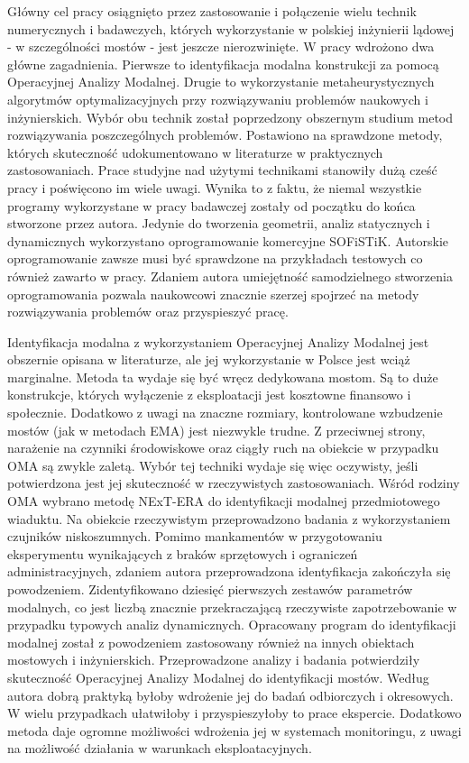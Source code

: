Główny cel pracy osiągnięto przez zastosowanie i połączenie wielu technik numerycznych i badawczych, których wykorzystanie w polskiej inżynierii lądowej - w szczególności mostów - jest jeszcze nierozwinięte. W pracy wdrożono dwa główne zagadnienia. Pierwsze to identyfikacja modalna konstrukcji za pomocą Operacyjnej Analizy Modalnej. Drugie to wykorzystanie metaheurystycznych algorytmów optymalizacyjnych przy rozwiązywaniu problemów naukowych i inżynierskich. Wybór obu technik został poprzedzony obszernym studium metod rozwiązywania poszczególnych problemów. Postawiono na sprawdzone metody, których skuteczność udokumentowano w literaturze w praktycznych zastosowaniach. Prace studyjne nad użytymi technikami stanowiły dużą cześć pracy i poświęcono im wiele uwagi. Wynika to z faktu, że niemal wszystkie programy wykorzystane w pracy badawczej zostały od początku do końca stworzone przez autora. Jedynie do tworzenia geometrii, analiz statycznych i dynamicznych wykorzystano oprogramowanie komercyjne SOFiSTiK. Autorskie oprogramowanie zawsze musi być sprawdzone na przykładach testowych co również zawarto w pracy. Zdaniem autora umiejętność samodzielnego stworzenia oprogramowania pozwala naukowcowi znacznie szerzej spojrzeć na metody rozwiązywania problemów oraz przyspieszyć pracę.

Identyfikacja modalna z wykorzystaniem Operacyjnej Analizy Modalnej jest obszernie opisana w literaturze, ale jej wykorzystanie w Polsce jest wciąż marginalne. Metoda ta wydaje się być wręcz dedykowana mostom. Są to duże konstrukcje, których wyłączenie z eksploatacji jest kosztowne finansowo i społecznie. Dodatkowo z uwagi na znaczne rozmiary, kontrolowane wzbudzenie mostów (jak w metodach EMA) jest niezwykle trudne. Z przeciwnej strony, narażenie na czynniki środowiskowe oraz ciągły ruch na obiekcie w przypadku OMA są zwykle zaletą. Wybór tej techniki wydaje się więc oczywisty, jeśli potwierdzona jest jej skuteczność w rzeczywistych zastosowaniach. Wśród rodziny OMA wybrano metodę NExT-ERA do identyfikacji modalnej przedmiotowego wiaduktu. Na obiekcie rzeczywistym przeprowadzono badania z wykorzystaniem czujników niskoszumnych. Pomimo mankamentów w przygotowaniu eksperymentu wynikających z braków sprzętowych i ograniczeń administracyjnych, zdaniem autora przeprowadzona identyfikacja zakończyła się powodzeniem. Zidentyfikowano dziesięć pierwszych zestawów parametrów modalnych, co jest liczbą znacznie przekraczającą rzeczywiste zapotrzebowanie w przypadku typowych analiz dynamicznych. Opracowany program do identyfikacji modalnej został z powodzeniem zastosowany również na innych obiektach mostowych i inżynierskich. Przeprowadzone analizy i badania potwierdziły skuteczność Operacyjnej Analizy Modalnej do identyfikacji mostów. Według autora dobrą praktyką byłoby wdrożenie jej do badań odbiorczych i okresowych. W wielu przypadkach ułatwiłoby i przyspieszyłoby to prace ekspercie. Dodatkowo metoda daje ogromne możliwości wdrożenia jej w systemach monitoringu, z uwagi na możliwość działania w warunkach eksploatacyjnych.

